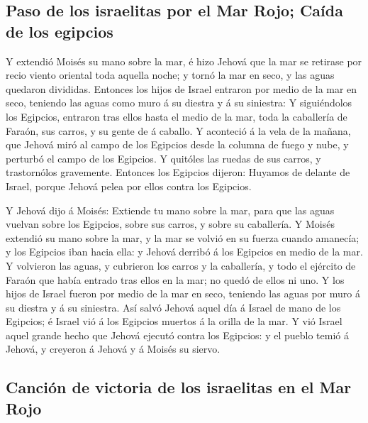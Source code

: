 \hypertarget{paso-de-los-israelitas-por-el-mar-rojo-cauxedda-de-los-egipcios}{%
\subsection{Paso de los israelitas por el Mar Rojo; Caída de los
egipcios}\label{paso-de-los-israelitas-por-el-mar-rojo-cauxedda-de-los-egipcios}}

 Y extendió Moisés su mano sobre la mar, é hizo Jehová que
la mar se retirase por recio viento oriental toda aquella noche; y tornó
la mar en seco, y las aguas quedaron divididas.  Entonces
los hijos de Israel entraron por medio de la mar en seco, teniendo las
aguas como muro á su diestra y á su siniestra:  Y
siguiéndolos los Egipcios, entraron tras ellos hasta el medio de la mar,
toda la caballería de Faraón, sus carros, y su gente de á caballo.
 Y aconteció á la vela de la mañana, que Jehová miró al
campo de los Egipcios desde la columna de fuego y nube, y perturbó el
campo de los Egipcios.  Y quitóles las ruedas de sus
carros, y trastornólos gravemente. Entonces los Egipcios dijeron:
Huyamos de delante de Israel, porque Jehová pelea por ellos contra los
Egipcios.

 Y Jehová dijo á Moisés: Extiende tu mano sobre la mar,
para que las aguas vuelvan sobre los Egipcios, sobre sus carros, y sobre
su caballería.  Y Moisés extendió su mano sobre la mar, y
la mar se volvió en su fuerza cuando amanecía; y los Egipcios iban hacia
ella: y Jehová derribó á los Egipcios en medio de la mar. 
Y volvieron las aguas, y cubrieron los carros y la caballería, y todo el
ejército de Faraón que había entrado tras ellos en la mar; no quedó de
ellos ni uno.  Y los hijos de Israel fueron por medio de la
mar en seco, teniendo las aguas por muro á su diestra y á su siniestra.
 Así salvó Jehová aquel día á Israel de mano de los
Egipcios; é Israel vió á los Egipcios muertos á la orilla de la mar.
 Y vió Israel aquel grande hecho que Jehová ejecutó contra
los Egipcios: y el pueblo temió á Jehová, y creyeron á Jehová y á Moisés
su siervo.

\hypertarget{canciuxf3n-de-victoria-de-los-israelitas-en-el-mar-rojo}{%
\subsection{Canción de victoria de los israelitas en el Mar
Rojo}\label{canciuxf3n-de-victoria-de-los-israelitas-en-el-mar-rojo}}

